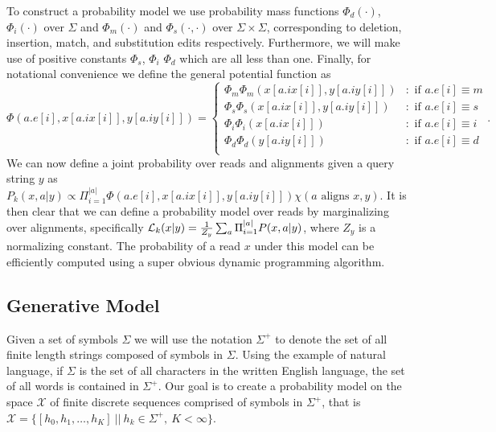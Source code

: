 To construct a probability model we use probability mass functions $\Phi_d(\cdot)$, $\Phi_i(\cdot)$ over $\Sigma$ and $\Phi_m(\cdot)$ and $\Phi_s(\cdot,\cdot)$ over $\Sigma \times \Sigma$, corresponding to deletion, insertion, match, and substitution edits respectively.  Furthermore, we will make use of positive constants $\Phi_s$, $\Phi_i$ $\Phi_d$ which are all less than one. Finally, for notational convenience we define the general potential function as
%
\[
\Phi(a.e[i], x[a.ix[i]], y[a.iy[i]]) = \left\{
\begin{array}{ll}
	\Phi_m \Phi_m(x[a.ix[i]], y[a.iy[i]])	& : \textrm{ if } a.e[i] \equiv m\\
	\Phi_s \Phi_s(x[a.ix[i]], y[a.iy[i]]) 									& : \textrm{ if } a.e[i] \equiv s\\
	\Phi_i \Phi_i(x[a.ix[i]]) 													& : \textrm{ if } a.e[i] \equiv i\\
	\Phi_d \Phi_d(y[a.iy[i]]) 												& : \textrm{ if } a.e[i] \equiv d\\
\end{array}
\right.
.
\]
%
We can now define a joint probability over reads and alignments given a query string $y$ as $P_k(x,a | y) \propto \Pi_{i = 1}^{|a|}\Phi(a.e[i],x[a.ix[i]], y[a.iy[i]]) \chi(a \textrm{ aligns } x,y)$.  It is then clear that we can define a probability model over reads by marginalizing over alignments, specifically $\likelihood_k(x | y) = \frac{1}{Z_y} \sum_a \Pi_{i = 1}^{|a|}P(x,a|y)$, where $Z_y$ is a normalizing constant.  The probability of a read $x$ under this model can be efficiently computed using a super obvious dynamic programming algorithm. 

\subsection{Generative Model}
\label{subsection_generative_model}
Given a set of symbols $\Sigma$ we will use the notation $\Sigma^+$ to denote the set of all finite length strings composed of symbols in $\Sigma$. Using the example of natural language, if $\Sigma$ is the set of all characters in the written English language, the set of all words is contained in $\Sigma^+$.  Our goal is to create a probability model on the space $\mathcal{X}$ of finite discrete sequences comprised of symbols in $\Sigma^+$, that is $\mathcal{X} = \{ [h_0, h_1, \ldots, h_K] \ || \ h_k \in \Sigma^+, \ K < \infty \}$.

